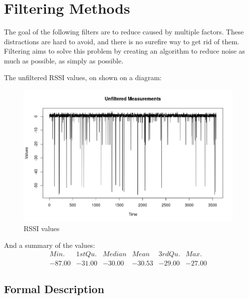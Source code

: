 \chapter{Filtering Methods}
\label{chap:filteringMethods}
The goal of the following filters are to reduce caused by  multiple factors. These distractions are hard to avoid, and there is no surefire way to get rid of them. Filtering aims to solve this problem by creating an algorithm to reduce noise as much as possible, as simply as possible.


The unfiltered RSSI values, on shown on a diagram:
\begin{figure}[!h]
	\centering
		\includegraphics[width=.9\linewidth]{figures/UnfilteredZeroV1.png}
		\caption{RSSI values \cite{HORUS}}\label{fig:UnfilteredZero}
\end{figure}

And a summary of the values:
$$
\begin{array}{cccccc}
Min.& 1st Qu. & Median & Mean & 3rd Qu. & Max.\\
-87.00 & -31.00 & -30.00 & -30.53 & -29.00 & -27.00
\end{array}
$$
\section{Formal Description}
